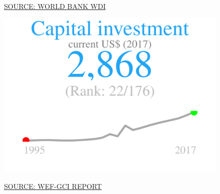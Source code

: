 \documentclass{article}\usepackage[]{graphicx}\usepackage[]{color}
\makeatletter
\def\maxwidth{ %
  \ifdim\Gin@nat@width>\linewidth
    \linewidth
  \else
    \Gin@nat@width
  \fi
}
\makeatother
\begin{document}
\begin{figure}
\begin{minipage}[t]{0.99\textwidth}
\begin{minipage}[t]{0.56\textwidth}
\begin{minipage}[c]{0.30\textwidth}
{}



    \vspace{-2ex}
    \hspace{2ex}\tiny{\href{http://data.worldbank.org/}{\textcolor[HTML]{22A6F5}{SOURCE: WORLD BANK WDI}}}
    \end{minipage}
    \begin{minipage}[c]{0.30\textwidth}


{\centering \includegraphics[width=\maxwidth]{figure/figure_sparkline6-1} 

}



    \vspace{-2ex}
    \hspace{2ex}\tiny{\href{http://reports.weforum.org/global-competitiveness-index/}{\textcolor[HTML]{22A6F5}{SOURCE: WEF-GCI REPORT}}}
    \end{minipage}
  \end{minipage}
\end{minipage}
\end{figure}
\end{document}
